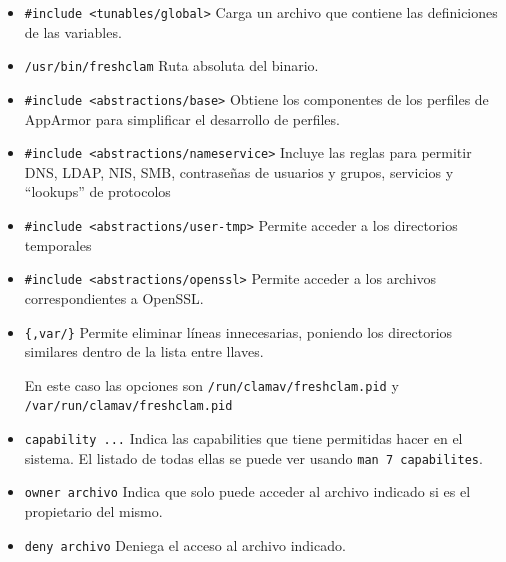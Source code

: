 \documentclass{article}
\begin{document}
\begin{itemize}
    \item \verb|#include <tunables/global>| Carga un archivo que contiene las definiciones de las variables.
    \item \verb|/usr/bin/freshclam| Ruta absoluta del binario.
    \item \verb|#include <abstractions/base>| Obtiene los componentes de los perfiles de AppArmor para simplificar el desarrollo de perfiles.
    \item \verb|#include <abstractions/nameservice>| Incluye las reglas para permitir DNS, LDAP, NIS, SMB, contraseñas de usuarios y grupos, servicios y ``lookups'' de protocolos
    \item \verb|#include <abstractions/user-tmp>| Permite acceder a los directorios temporales
    \item \verb|#include <abstractions/openssl>| Permite acceder a los archivos correspondientes a OpenSSL.
    \item \verb|{,var/}| Permite eliminar líneas innecesarias, poniendo los directorios similares dentro de la lista entre llaves. 
    
    \bigskip

    En este caso las opciones son \verb|/run/clamav/freshclam.pid| y \verb|/var/run/clamav/freshclam.pid|
    \item \verb|capability ...| Indica las capabilities que tiene permitidas hacer en el sistema. El listado de todas ellas se puede ver usando \verb|man 7 capabilites|.
    \item \verb|owner archivo| Indica que solo puede acceder al archivo indicado si es el propietario del mismo.
    \item \verb|deny archivo| Deniega el acceso al archivo indicado.
\end{itemize}
\end{document}

